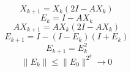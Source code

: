 \documentclass{article}
\begin{document}
\[
X_{k+1}=X_k(2I-AX_k)
\]
\[
E_k=I-AX_k
\]
\[
AX_{k+1}=AX_k(2I-AX_k)
\]
\[
E_{k+1}=I-(I-E_k)(I+E_k)
\]
\[
E_{k+1}=E_k^2
\]
\[
\|E_k\|\leq\|E_0\|^{2^k}\to0
\]
\end{document}
